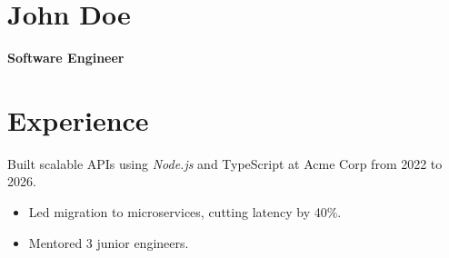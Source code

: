 \documentclass[11pt]{article}
\begin{document}
\section*{John Doe}
\textbf{Software Engineer}

\section*{Experience}
Built scalable APIs using \textit{Node.js} and TypeScript at Acme Corp from 2022 to 2026.

\begin{itemize}
  \item Led migration to microservices, cutting latency by 40\%.
  \item Mentored 3 junior engineers.
\end{itemize}
\end{document}
